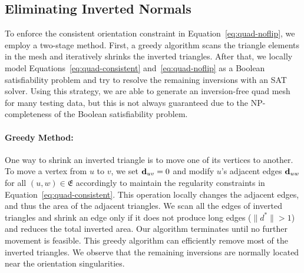 \subsection{Eliminating Inverted Normals}
\label{sec:quad-flip}
To enforce the consistent orientation constraint in Equation~\eqref{eq:quad-noflip}, we employ a two-stage method.  First, a greedy algorithm scans the triangle elements in the mesh and iteratively shrinks the inverted triangles. After that, we locally model Equations~\eqref{eq:quad-consistent} and~\eqref{eq:quad-noflip} as a Boolean satisfiability problem and try to resolve the remaining inversions with an SAT solver.  Using this strategy, we are able to generate an inversion-free quad mesh for many testing data, but this is not always guaranteed due to the NP-completeness of the Boolean satisfiability problem.

\paragraph*{Greedy Method:}
One way to shrink an inverted triangle is to move one of its vertices to another. To move a vertex from $u$ to $v$, we set ${\mathbf{d}}_{uv}=0$ and modify $u$'s adjacent edges ${\mathbf{d}}_{uw}$ for all $(u,w)\in\mathfrak{E}$ accordingly to maintain the regularity constraints in Equation~\eqref{eq:quad-consistent}.  This operation locally changes the adjacent edges, and thus the area of the adjacent triangles. We scan all the edges of inverted triangles and shrink an edge only if it does not produce long edges ($\|d^*\|>1$) and reduces the total inverted area.  Our algorithm terminates until no further movement is feasible. This greedy algorithm can efficiently remove most of the inverted triangles. We observe that the remaining inversions are normally located near the orientation singularities.

